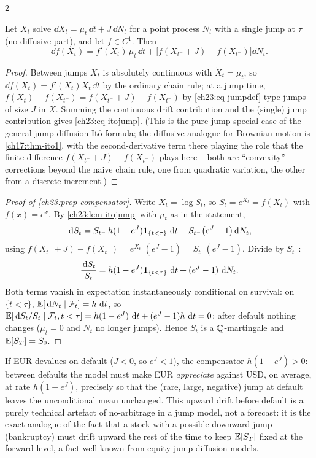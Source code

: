\begin{paracol}{2}
\begin{lemma}\label{ch23:lem-itojump}
Let $X_t$ solve $\dd X_t=\mu_t\,\dd t+J\,\dd N_t$ for a point process $N_t$ with a single jump at $\tau$
(no diffusive part), and let $f\in C^1$. Then
\begin{equation}\label{ch23:eq-itojump}
  \dd f(X_t)=f'(X_t)\,\mu_t\,\dd t+\bigl[f(X_{t^-}+J)-f(X_{t^-})\bigr]\dd N_t .
\end{equation}
\end{lemma}
\begin{proof}
Between jumps $X_t$ is absolutely continuous with $\dot X_t=\mu_t$, so $\dd f(X_t)=f'(X_t)\dot X_t\,\dd t$ by the
ordinary chain rule; at a jump time, $f(X_t)-f(X_{t^-})=f(X_{t^-}+J)-f(X_{t^-})$ by \cref{ch23:eq-jumpdef}-type
jumps of size $J$ in $X$. Summing the continuous drift contribution and the (single) jump contribution gives
\cref{ch23:eq-itojump}. (This is the pure-jump special case of the general jump-diffusion It\^o formula; the
diffusive analogue for Brownian motion is \cref{ch17:thm-ito1}, with the second-derivative term there playing the
role that the finite difference $f(X_{t^-}+J)-f(X_{t^-})$ plays here -- both are ``convexity'' corrections beyond
the naive chain rule, one from quadratic variation, the other from a discrete increment.)
\end{proof}

\begin{proof}[Proof of \cref{ch23:prop-compensator}]
Write $X_t=\log S_t$, so $S_t=e^{X_t}=f(X_t)$ with $f(x)=e^x$. By \cref{ch23:lem-itojump} with $\mu_t$ as in the
statement,
\[
  \,\mathrm{d} S_t = S_{t^-}\,h(1-e^J)\mathbf{1}_{\{t<\tau\}}\,\,\mathrm{d} t + S_{t^-}\bigl(e^J-1\bigr)\,\mathrm{d} N_t ,
\]
using $f(X_{t^-}+J)-f(X_{t^-})=e^{X_{t^-}}(e^J-1)=S_{t^-}(e^J-1)$. Divide by $S_{t^-}$:
\begin{equation}\label{ch23:eq-dSoverS}
  \frac{\,\mathrm{d} S_t}{S_t}=h(1-e^J)\mathbf{1}_{\{t<\tau\}}\,\,\mathrm{d} t+(e^J-1)\,\,\mathrm{d} N_t .
\end{equation}
Both terms vanish in expectation instantaneously conditional on survival: on $\{t<\tau\}$, $\mathbb{E}[\,\mathrm{d} N_t\mid
\mathcal F_t]=h\,\,\mathrm{d} t$, so $\mathbb{E}[\,\mathrm{d} S_t/S_t\mid\mathcal F_t,t<\tau]=h(1-e^J)\,\,\mathrm{d} t+(e^J-1)h\,\,\mathrm{d} t=0$; after
default nothing changes ($\mu_t=0$ and $N_t$ no longer jumps). Hence $S_t$ is a $\mathbb{Q}$-martingale and $\mathbb{E}[S_T]=S_0$.
\end{proof}

\begin{intuition}
If EUR devalues on default ($J<0$, so $e^J<1$), the compensator $h(1-e^J)>0$: between defaults the model must make
EUR \emph{appreciate} against USD, on average, at rate $h(1-e^J)$, precisely so that the (rare, large, negative)
jump at default leaves the unconditional mean unchanged. This upward drift before default is a purely technical
artefact of no-arbitrage in a jump model, not a forecast: it is the exact analogue of the fact that a stock with a
possible downward jump (bankruptcy) must drift upward the rest of the time to keep $\mathbb{E}[S_T]$ fixed at the forward
level, a fact well known from equity jump-diffusion models.
\end{intuition}


\end{paracol}
